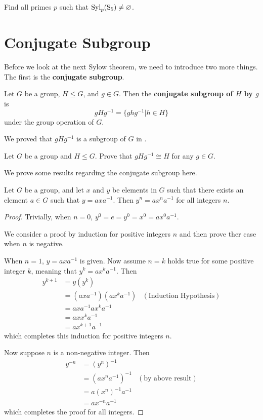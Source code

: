 \begin{exercise}
    Find all primes $p$ such that $\mathrm{Syl}_{p}(\mathrm{S}_{5}) \neq \varnothing$.
\end{exercise}

\section{Conjugate Subgroup}
Before we look at the next Sylow theorem, we need to introduce two more things. The first is the \textbf{conjugate subgroup}.
\begin{definition}
    Let $G$ be a group, $H \leq G$, and $g \in G$. Then the \textbf{conjugate subgroup of $H$ by $g$} is
    \[
        gHg^{-1} = \{ghg^{-1} \vert h \in H\}
    \]
    under the group operation of $G$.
\end{definition}
We proved that $gHg^{-1}$ is a subgroup of $G$ in .

\begin{exercise}\label{exercise-conjugate-subgroup-isomorphic-to-subgroup}
    Let $G$ be a group and $H \leq G$. Prove that $gHg^{-1} \cong H$ for any $g \in G$.
\end{exercise}

We prove some results regarding the conjugate subgroup here.
\begin{proposition}\label{prop-power-of-conjugate-equals-conjugate-of-power}
    Let $G$ be a group, and let $x$ and $y$ be elements in $G$ such that there exists an element $a \in G$ such that $y = axa^{-1}$. Then $y^n = ax^na^{-1}$ for all integers $n$.
\end{proposition}
\begin{proof}
    Trivially, when $n = 0$, $y^0 = e = y^0 = x^0 = ax^0a^{-1}$.

    We consider a proof by induction for positive integers $n$ and then prove ther case when $n$ is negative.

    When $n = 1$, $y = axa^{-1}$ is given. Now assume $n = k$ holds true for some positive integer $k$, meaning that $y^k = ax^ka^{-1}$. Then
    \begin{align*}
        y^{k+1} &= y(y^k)\\
        &= (axa^{-1})(ax^ka^{-1}) & (\text{Induction Hypothesis})\\
        &= axa^{-1}ax^ka^{-1}\\
        &= axx^ka^{-1}\\
        &= ax^{k+1}a^{-1}
    \end{align*}
    which completes this induction for positive integers $n$.

    Now suppose $n$ is a non-negative integer. Then
    \begin{align*}
        y^{-n} &= (y^n)^{-1}\\
        &= (ax^na^{-1})^{-1} & (\text{by above result})\\
        &= a(x^n)^{-1}a^{-1}\\
        &= ax^{-n}a^{-1}
    \end{align*}
    which completes the proof for all integers.
\end{proof}

